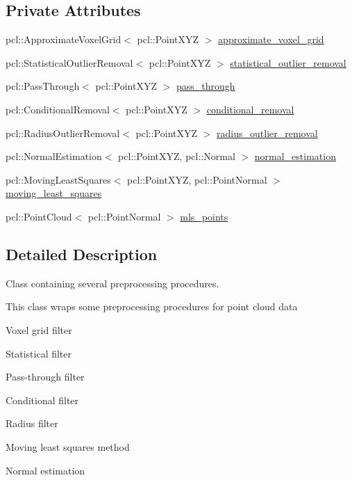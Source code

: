 \subsection*{Private Attributes}
\begin{DoxyCompactItemize}
\item 
pcl\+::\+Approximate\+Voxel\+Grid$<$ pcl\+::\+Point\+X\+YZ $>$ \hyperlink{classhull__abstraction_1_1_preprocessor_af75daaefbd886add3f9bc1c8560e5a4e}{approximate\+\_\+voxel\+\_\+grid}
\item 
pcl\+::\+Statistical\+Outlier\+Removal$<$ pcl\+::\+Point\+X\+YZ $>$ \hyperlink{classhull__abstraction_1_1_preprocessor_af9b4760942460988811e9989da18633f}{statistical\+\_\+outlier\+\_\+removal}
\item 
pcl\+::\+Pass\+Through$<$ pcl\+::\+Point\+X\+YZ $>$ \hyperlink{classhull__abstraction_1_1_preprocessor_a9396fe58d584ed1e7468f694f2458734}{pass\+\_\+through}
\item 
pcl\+::\+Conditional\+Removal$<$ pcl\+::\+Point\+X\+YZ $>$ \hyperlink{classhull__abstraction_1_1_preprocessor_a15ce757be74b4d80302c832b4b97f459}{conditional\+\_\+removal}
\item 
pcl\+::\+Radius\+Outlier\+Removal$<$ pcl\+::\+Point\+X\+YZ $>$ \hyperlink{classhull__abstraction_1_1_preprocessor_af0a5e8dd7c130abe702230dd59529360}{radius\+\_\+outlier\+\_\+removal}
\item 
pcl\+::\+Normal\+Estimation$<$ pcl\+::\+Point\+X\+YZ, pcl\+::\+Normal $>$ \hyperlink{classhull__abstraction_1_1_preprocessor_a144ae161c0d90bcc829f83c49172de82}{normal\+\_\+estimation}
\item 
pcl\+::\+Moving\+Least\+Squares$<$ pcl\+::\+Point\+X\+YZ, pcl\+::\+Point\+Normal $>$ \hyperlink{classhull__abstraction_1_1_preprocessor_abc825ebe97845aece984cae1b37208b3}{moving\+\_\+least\+\_\+squares}
\item 
pcl\+::\+Point\+Cloud$<$ pcl\+::\+Point\+Normal $>$ \hyperlink{classhull__abstraction_1_1_preprocessor_af91d53e1e4dadaa51f3518b100598b93}{mls\+\_\+points}
\end{DoxyCompactItemize}


\subsection{Detailed Description}
Class containing several preprocessing procedures. 

This class wraps some preprocessing procedures for point cloud data
\begin{DoxyItemize}
\item Voxel grid filter
\item Statistical filter
\item Pass-\/through filter
\item Conditional filter
\item Radius filter
\item Moving least squares method
\item Normal estimation 
\end{DoxyItemize}

